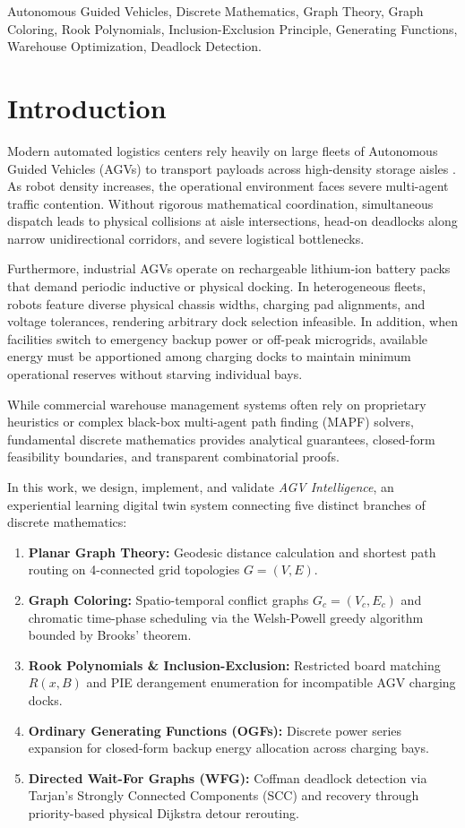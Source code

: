 \documentclass[conference]{IEEEtran}
\begin{document}
\begin{IEEEkeywords}
Autonomous Guided Vehicles, Discrete Mathematics, Graph Theory, Graph Coloring, Rook Polynomials, Inclusion-Exclusion Principle, Generating Functions, Warehouse Optimization, Deadlock Detection.
\end{IEEEkeywords}

\section{Introduction}
Modern automated logistics centers rely heavily on large fleets of Autonomous Guided Vehicles (AGVs) to transport payloads across high-density storage aisles \cite{wurman2008coordinating, leanh2006review}. As robot density increases, the operational environment faces severe multi-agent traffic contention. Without rigorous mathematical coordination, simultaneous dispatch leads to physical collisions at aisle intersections, head-on deadlocks along narrow unidirectional corridors, and severe logistical bottlenecks. 

Furthermore, industrial AGVs operate on rechargeable lithium-ion battery packs that demand periodic inductive or physical docking. In heterogeneous fleets, robots feature diverse physical chassis widths, charging pad alignments, and voltage tolerances, rendering arbitrary dock selection infeasible. In addition, when facilities switch to emergency backup power or off-peak microgrids, available energy must be apportioned among charging docks to maintain minimum operational reserves without starving individual bays.

While commercial warehouse management systems often rely on proprietary heuristics or complex black-box multi-agent path finding (MAPF) solvers, fundamental discrete mathematics provides analytical guarantees, closed-form feasibility boundaries, and transparent combinatorial proofs. 

In this work, we design, implement, and validate \textit{AGV Intelligence}, an experiential learning digital twin system connecting five distinct branches of discrete mathematics:
\begin{enumerate}
    \item \textbf{Planar Graph Theory:} Geodesic distance calculation and shortest path routing on 4-connected grid topologies $G=(V, E)$.
    \item \textbf{Graph Coloring:} Spatio-temporal conflict graphs $G_c=(V_c, E_c)$ and chromatic time-phase scheduling via the Welsh-Powell greedy algorithm bounded by Brooks' theorem.
    \item \textbf{Rook Polynomials \& Inclusion-Exclusion:} Restricted board matching $R(x, B)$ and PIE derangement enumeration for incompatible AGV charging docks.
    \item \textbf{Ordinary Generating Functions (OGFs):} Discrete power series expansion for closed-form backup energy allocation across charging bays.
    \item \textbf{Directed Wait-For Graphs (WFG):} Coffman deadlock detection via Tarjan's Strongly Connected Components (SCC) and recovery through priority-based physical Dijkstra detour rerouting.
\end{enumerate}
\end{document}
